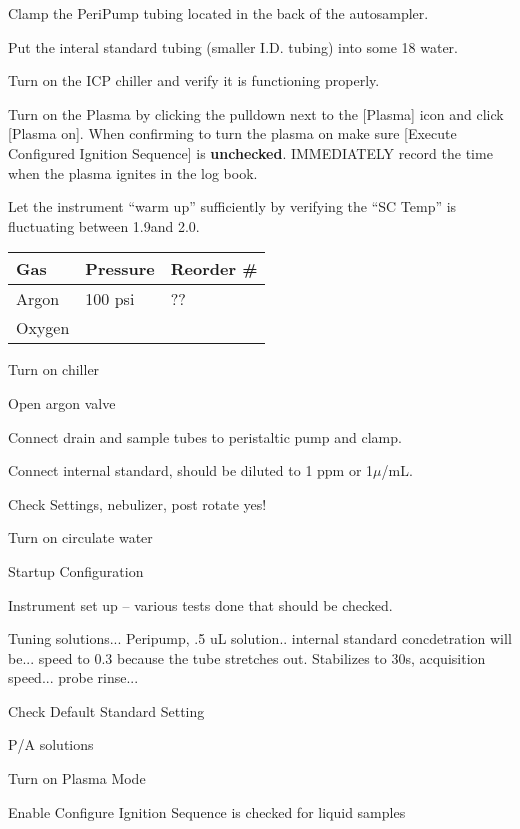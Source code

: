 \documentclass[12pt]{../SOP4_alpha}\usepackage[]{graphicx}\usepackage[]{color}
\begin{document}
\NP Clamp the PeriPump tubing located in the back of the autosampler.

\NP Put the interal standard tubing (smaller I.D. tubing) into some 18 \ohm water.

\NP Turn on the ICP chiller and verify it is functioning properly.

\NP Turn on the Plasma by clicking the pulldown next to the [Plasma] icon and click [Plasma on]. When confirming to turn the plasma on make sure [Execute Configured Ignition Sequence] is \textbf{unchecked}. IMMEDIATELY record the time when the plasma ignites in the log book.

\NP Let the instrument ``warm up'' sufficiently by verifying the ``SC Temp'' is fluctuating between 1.9\celsius and 2.0\celsius.



\begin{table}[h]
\begin{tabular}{lll} \hline
Gas   &     Pressure    & Reorder \# \\ \hline\hline
Argon &       100 psi   & ??          \\
Oxygen&                 & \\ \hline

\end{tabular}
\end{table}

\NP Turn on chiller

\NP Open argon valve

\NP Connect drain and sample tubes to peristaltic pump and clamp.

\NP Connect internal standard, should be diluted to 1 ppm or 1$\mu$/mL.

\NP Check Settings, nebulizer, post rotate yes!

\NP Turn on circulate water

\NP Startup Configuration

\NP Instrument set up -- various tests done that should be checked.

\NP Tuning solutions... Peripump, .5 uL solution.. internal standard concdetration will be...  speed to 0.3 because the tube stretches out. Stabilizes to 30s, acquisition speed... probe rinse... 

\NP Check Default Standard Setting

\NP P/A solutions

\NP Turn on Plasma Mode 

\NP Enable Configure Ignition Sequence is checked for liquid samples
\end{document}
